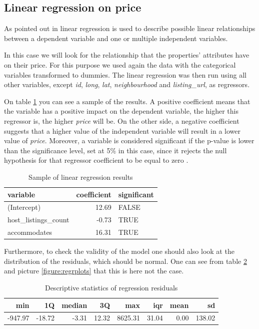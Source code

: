 \subsection{Linear regression on price}\label{subsec:lm}

As pointed out in \cite{wang2017price} linear regression is used to describe possible linear relationships between a dependent variable and one or multiple independent variables.

In this case we will look for the relationship that the properties' attributes have on their price. For this purpose we used again the data with the categorical variables transformed to dummies. The linear regression was then run using all other variables, except \textit{id}, \textit{long}, \textit{lat}, \textit{neighbourhood} and \textit{listing\_url}, as regressors.

On table \ref{table:lmresults} you can see a sample of the results. A positive coefficient means that the variable has a positive impact on the dependent variable, the higher this regressor is, the higher \textit{price} will be. On the other side, a negative coefficient suggests that a higher value of the independent variable will result in a lower value of \textit{price}. Moreover, a variable is considered significant if the p-value is lower than the significance level, set at 5\% in this case, since it rejects the null hypothesis for that regressor coefficient to be equal to zero \cite{moye2006statistical}.

\begin{table}[H]
\centering
\begin{tabular}{lrl}
  \hline
variable & coefficient & significant \\ 
  \hline
(Intercept) & 12.69 & FALSE \\ 
  host\_listings\_count & -0.73 & TRUE \\ 
  accommodates & 16.31 & TRUE \\ 
   \hline
\end{tabular}
\caption{Sample of linear regression results}
\label{table:lmresults}
\end{table}

Furthermore, to check the validity of the model one should also look at the distribution of the residuals, which should be normal. One can see from table \ref{table:lmresidualst} and picture \ref{figure:regrplots} that this is here not the case.

\begin{table}[H]
\centering
\begin{tabular}{rrrrrrrr}
  \hline
min & 1Q & median & 3Q & max & iqr & mean & sd \\ 
  \hline
-947.97 & -18.72 & -3.31 & 12.32 & 8625.31 & 31.04 & 0.00 & 138.02 \\ 
   \hline
\end{tabular}
\caption{Descriptive statistics of regression residuals}
\label{table:lmresidualst}
\end{table}

